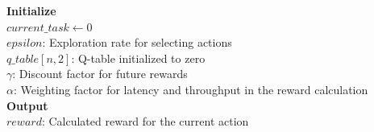     \begin{algorithm}[H]
        \caption{Task Offloading Environment Simulation}
        \label{alg:task_offloading}
        \textbf{Initialize}\\
                $current\_task \gets 0$\\
                $epsilon$: Exploration rate for selecting actions\\
                $q\_table[n, 2]$: Q-table initialized to zero\\
                $\gamma$: Discount factor for future rewards\\
                $\alpha$: Weighting factor for latency and throughput in the reward calculation\\
        \textbf{Output}\\
            $reward$: Calculated reward for the current action\\
            

\end{algorithm}
